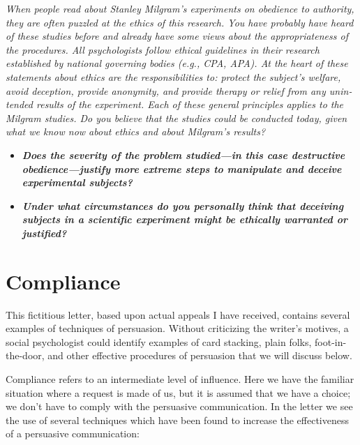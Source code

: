 \documentclass[
]{book}
\providecommand{\tightlist}{%
  \setlength{\itemsep}{0pt}\setlength{\parskip}{0pt}}
\begin{document}
\begin{reflect}
\emph{When people read about Stanley Milgram's experiments on obedience to au­thor­ity, they are often puzzled at the ethics of this research. You have probably have heard of these studies before and already have some views about the ap­propriate­ness of the procedures. All psychologists follow ethical guidelines in their research established by national governing bodies (e.g., CPA, APA). At the heart of these state­ments about ethics are the responsibilities to: protect the subject's welfare, avoid deception, provide anonymity, and provide therapy or relief from any unin­tended results of the experiment. Each of these general principles applies to the Milgram studies. Do you believe that the studies could be conducted today, given what we know now about ethics and about Milgram's results?}

\begin{itemize}
\tightlist
\item
  \textbf{\emph{Does the severity of the problem studied---in this case destructive obedience---justify more extreme steps to manipulate and deceive experimental subjects?}}\\
\item
  \textbf{\emph{Under what circumstances do you personally think that deceiving subjects in a scientific experiment might be ethically warranted or justified?}}
\end{itemize}
\end{reflect}

\hypertarget{compliance}{%
\section{Compliance}\label{compliance}}

This fictitious letter, based upon actual appeals I have received, contains several examples of techniques of persuasion. Without criticizing the writer's motives, a social psychologist could identify examples of card stacking, plain folks, foot-in-the-door, and other effective procedures of persuasion that we will discuss below.

Compliance refers to an intermediate level of influence. Here we have the familiar situation where a request is made of us, but it is assumed that we have a choice; we don't have to comply with the persuasive communication. In the letter we see the use of several techniques which have been found to increase the effectiveness of a persuasive communication:
\end{document}
